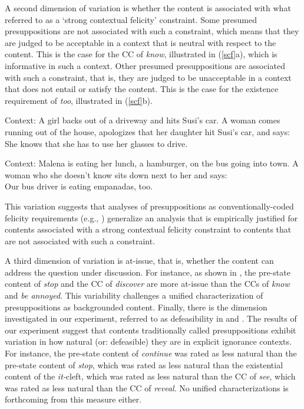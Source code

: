 \documentclass[11pt,fleqn]{article}
\def\infelic{{\leavevmode\llap{\#}}}
\newcommand{\6}{\mbox{$[\hspace*{-.6mm}[$}}
\newcommand{\9}{\mbox{$]\hspace*{-.6mm}]$}}
\begin{document}
A second dimension of variation is whether the content is associated with what \citealt{brst-lang11} referred to as a `strong contextual felicity' constraint. Some presumed presuppositions are not associated with such a constraint, which means that they are judged to be acceptable in a context that is neutral with respect to the content. This is the case for the CC of {\em know}, illustrated in (\ref{scf}a), which is informative in such a context. Other presumed presuppositions are associated with such a constraint, that is, they are judged to be unacceptable in a context that does not entail or satisfy the content. This is the case for the existence requirement of {\em too}, illustrated in (\ref{scf}b).

\begin{exe}
\ex\label{scf} \citealt[78, 80]{brst-lang11}
\begin{xlist}
\ex Context: A girl backs out of a driveway and hits Susi's car. A woman comes running out of the house, apologizes that her daughter hit Susi's car, and says: \\ She knows that she has to use her glasses to drive.

\ex Context: Malena is eating her lunch, a hamburger, on the bus going into town. A woman who she doesn't know sits down next to her and says:
\\ \infelic Our bus driver is eating empanadas, too.

\end{xlist}
\end{exe}
This variation suggests that analyses of presuppositions as conventionally-coded felicity requirements (e.g., \citealt{heim83,vds92}) generalize an analysis that is empirically justified for contents associated with a strong contextual felicity constraint to contents that are not associated with such a constraint. 

A third dimension of variation is at-issue, that is, whether the content can address the question under discussion. For instance, as shown in \citealt{tbd-variability}, the pre-state content of {\em stop} and the CC of {\em discover} are more at-issue than the CCs of {\em know} and {\em be annoyed}. This variability challenges a unified characterization of presuppositions as backgrounded content. Finally, there is the dimension investigated in our experiment, referred to as defeasibility in \citealt{simons01} and \citealt{abusch10}. The results of our experiment suggest that contents traditionally called presuppositions exhibit variation in how natural (or: defeasible) they are in explicit ignorance contexts. For instance,  the pre-state content of {\em continue} was rated as less natural than the pre-state content of {\em stop}, which was rated as less natural than the existential content of the {\em it-}cleft, which was rated as less natural than the CC of {\em see}, which was rated as less natural than the CC of {\em reveal}. No unified characterizations is forthcoming from this measure either.
\end{document}
